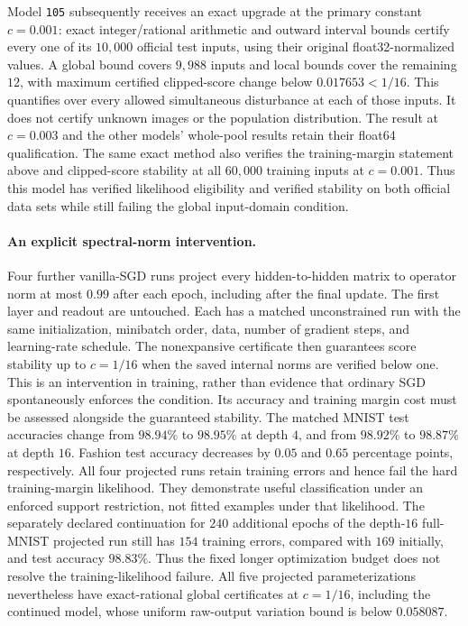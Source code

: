 Model \texttt{105} subsequently receives an exact upgrade at the primary
constant $c=0.001$: exact integer/rational arithmetic and outward
interval bounds certify every one of its $10{,}000$ official test inputs,
using their original float32-normalized values. A global bound covers
$9{,}988$ inputs and local bounds cover the remaining $12$, with maximum
certified clipped-score change below $0.017653<1/16$.
This quantifies over every allowed simultaneous disturbance at each of
those inputs. It does not certify unknown images or the population
distribution. The result at $c=0.003$ and the other models' whole-pool
results retain their float64 qualification.
The same exact method also verifies the training-margin statement above
and clipped-score stability at all $60{,}000$ training inputs at
$c=0.001$. Thus this model has verified likelihood eligibility and
verified stability on both official data sets while still failing the
global input-domain condition.

\paragraph{An explicit spectral-norm intervention.}
Four further vanilla-SGD runs project every hidden-to-hidden matrix
to operator norm at most $0.99$ after each epoch, including after the
final update. The first layer and readout are untouched. Each has a
matched unconstrained run with the same initialization, minibatch order,
data, number of gradient steps, and learning-rate schedule. The
nonexpansive certificate then guarantees score stability up to
$c=1/16$ when the saved internal norms are verified below one.
This is an intervention in training, rather than evidence that ordinary
SGD spontaneously enforces the condition. Its accuracy and training
margin cost must be assessed alongside the guaranteed stability.
The matched MNIST test accuracies change from $98.94\%$ to $98.95\%$
at depth $4$, and from $98.92\%$ to $98.87\%$ at depth $16$.
Fashion test accuracy decreases by $0.05$ and $0.65$ percentage points,
respectively. All four projected runs retain training errors and hence
fail the hard training-margin likelihood. They demonstrate useful
classification under an enforced support restriction, not fitted
examples under that likelihood.
The separately declared continuation for $240$ additional epochs of the depth-$16$
full-MNIST projected run still has $154$ training errors, compared with
$169$ initially, and test accuracy $98.83\%$. Thus the fixed longer
optimization budget does not resolve the training-likelihood failure.
All five projected parameterizations nevertheless have exact-rational
global certificates at $c=1/16$, including the continued model, whose
uniform raw-output variation bound is below $0.058087$.

